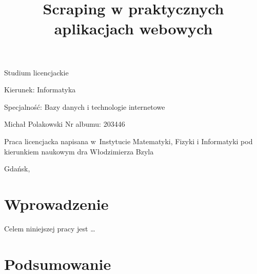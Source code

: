 \documentclass[12pt,a4paper,twoside,openany,parskip=full,parindent=full]{book}
\begin{document}
\begin{center}

\vspace{1cm}

Studium licencjackie
\end{center}

\vspace{1cm}

\noindent Kierunek: Informatyka

\noindent Specjalność: Bazy danych i technologie internetowe

\vspace{1cm}

{
\leftskip=10cm\noindent
Michał Polakowski\newline
Nr albumu: 203446

}

\vspace{2cm}

\title{Scraping w praktycznych aplikacjach webowych}
\makeatletter

\begin{center}
\LARGE\bf
\@title
\end{center}

\vspace{2cm}

{
\leftskip=10cm\noindent
Praca licencjacka\newline 
napisana w~Instytucie Matematyki, Fizyki i Informatyki\newline
pod kierunkiem naukowym\newline
dra Włodzimierza Bzyla

}

\vfill

\begin{center}
Gdańsk, \the\year
\end{center}
\thispagestyle{empty}

\clearpage
\thispagestyle{empty}
\clearpage

\tableofcontents

\clearpage


\chapter{Wprowadzenie}

Celem niniejszej pracy jest \ldots



\chapter{Podsumowanie}



\clearpage
{}
\begin{thebibliography}{99}
\setlength{\itemsep}{0pt}
\end{thebibliography}

\clearpage
\end{document}
